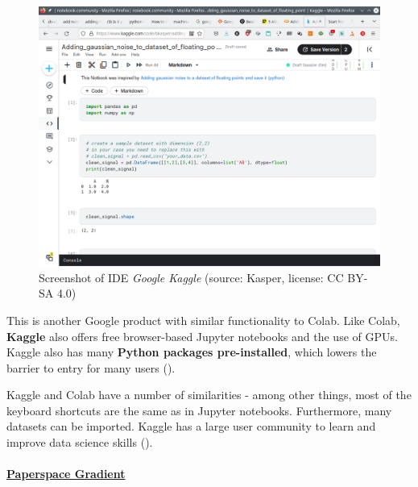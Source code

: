 \documentclass [oneside,10pt,a4paper,ngerman,BCOR10mm,headsepline,parindent,final]{scrartcl}
\begin{document}
\begin{figure}
\centering
\includegraphics{images/Screenshot_google_Kaggle.png}
\caption{Screenshot of IDE \emph{Google Kaggle} (source: Kasper,
license: CC BY-SA 4.0)}
\end{figure}

This is another Google product with similar functionality to Colab. Like
Colab, \textbf{Kaggle} also offers free browser-based Jupyter notebooks
and the use of GPUs. Kaggle also has many \textbf{Python packages
pre-installed}, which lowers the barrier to entry for many users
(\cite{Colab_Alternatives_2021}).

Kaggle and Colab have a number of similarities - among other things,
most of the keyboard shortcuts are the same as in Jupyter notebooks.
Furthermore, many datasets can be imported. Kaggle has a large user
community to learn and improve data science skills
(\cite{Colab_5_Alternatives_2021}).

    \hypertarget{paperspace-gradient}{%
\paragraph{\texorpdfstring{\href{https://www.paperspace.com/gradient/notebooks}{Paperspace
Gradient}}{Paperspace Gradient}}\label{paperspace-gradient}}
\end{document}
